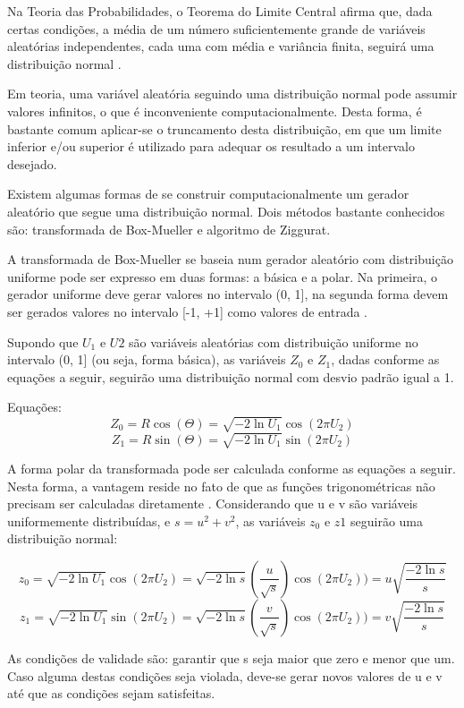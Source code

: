 Na Teoria das Probabilidades, o Teorema do Limite Central afirma que, dada certas condições, a média de um número suficientemente grande de variáveis aleatórias independentes, cada uma com média e variância finita, seguirá uma distribuição normal \cite{teoremalimitecentral}.

Em teoria, uma variável aleatória seguindo uma distribuição normal pode assumir valores infinitos, o que é inconveniente computacionalmente. Desta forma, é bastante comum aplicar-se o truncamento desta distribuição, em que um limite inferior e/ou superior é utilizado para adequar os resultado a um intervalo desejado.

Existem algumas formas de se construir computacionalmente um gerador aleatório que segue uma distribuição normal. Dois métodos bastante conhecidos são: transformada de Box-Mueller e algoritmo de Ziggurat.

A transformada de Box-Mueller se baseia num gerador aleatório com distribuição uniforme pode ser expresso em duas formas: a básica e a polar. Na primeira, o gerador uniforme deve gerar valores no intervalo (0, 1], na segunda forma devem ser gerados valores no intervalo [-1, +1] como valores de entrada \cite{boxmueller}.

Supondo que \(U_{1}\) e \(U{2}\) são variáveis aleatórias com distribuição uniforme no intervalo (0, 1] (ou seja, forma básica), as variáveis \(Z_{0}\) e \(Z_{1}\), dadas conforme as equações a seguir, seguirão uma distribuição normal com desvio padrão igual a 1.

Equações:
\[Z_{0} = R\cos{(\Theta)} = \sqrt{-2\ln{U_{1}}}\cos{(2\pi U_{2})}\]
\[Z_{1} = R\sin{(\Theta)} = \sqrt{-2\ln{U_{1}}}\sin{(2\pi U_{2})}\]

A forma polar da transformada pode ser calculada conforme as equações a seguir. Nesta forma, a vantagem reside no fato de que as funções trigonométricas não precisam ser calculadas diretamente \cite{wikiboxmueller}. Considerando que u e v são variáveis uniformemente distribuídas,  e \(s = u^{2} + v^{2}\), as variáveis \(z_{0}\) e \(z{1}\) seguirão uma distribuição normal:

\[z_{0} = \sqrt{-2\ln{U_{1}}}\cos{(2\pi U_{2})} = \sqrt{-2\ln{s}}(\frac{u}{\sqrt{s}})\cos{(2\pi U_{2})}) = u\sqrt{\frac{-2\ln{s}}{s}}\]
\[z_{1} = \sqrt{-2\ln{U_{1}}}\sin{(2\pi U_{2})} = \sqrt{-2\ln{s}}(\frac{v}{\sqrt{s}})\cos{(2\pi U_{2})}) = v\sqrt{\frac{-2\ln{s}}{s}}\]

As condições de validade são: garantir que s seja maior que zero e menor que um. Caso alguma destas condições seja violada, deve-se gerar novos valores de u e v até que as condições sejam satisfeitas.

